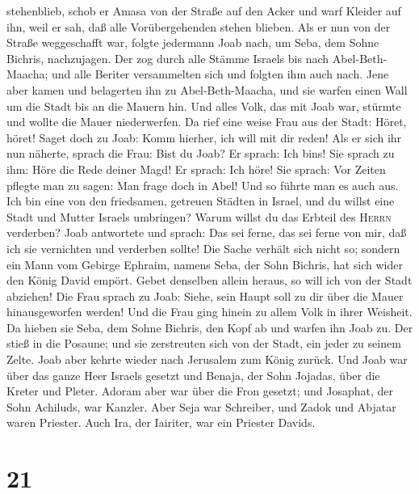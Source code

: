 stehenblieb, schob er Amasa von der Straße auf den Acker und warf
Kleider auf ihn, weil er sah, daß alle Vorübergehenden stehen blieben.
 Als er nun von der Straße weggeschafft war, folgte
jedermann Joab nach, um Seba, dem Sohne Bichris, nachzujagen.
 Der zog durch alle Stämme Israels bis nach
Abel-Beth-Maacha; und alle Beriter versammelten sich und folgten ihm
auch nach.  Jene aber kamen und belagerten ihn zu
Abel-Beth-Maacha, und sie warfen einen Wall um die Stadt bis an die
Mauern hin. Und alles Volk, das mit Joab war, stürmte und wollte die
Mauer niederwerfen.  Da rief eine weise Frau aus der
Stadt: Höret, höret! Saget doch zu Joab: Komm hierher, ich will mit dir
reden!  Als er sich ihr nun näherte, sprach die Frau:
Bist du Joab? Er sprach: Ich bin\textquotesingle s! Sie sprach zu ihm:
Höre die Rede deiner Magd! Er sprach: Ich höre!  Sie
sprach: Vor Zeiten pflegte man zu sagen: Man frage doch in Abel! Und so
führte man es auch aus.  Ich bin eine von den friedsamen,
getreuen Städten in Israel, und du willst eine Stadt und Mutter Israels
umbringen? Warum willst du das Erbteil des \textsc{Herrn} verderben?
 Joab antwortete und sprach: Das sei ferne, das sei ferne
von mir, daß ich sie vernichten und verderben sollte! 
Die Sache verhält sich nicht so; sondern ein Mann vom Gebirge Ephraim,
namens Seba, der Sohn Bichris, hat sich wider den König David empört.
Gebet denselben allein heraus, so will ich von der Stadt abziehen! Die
Frau sprach zu Joab: Siehe, sein Haupt soll zu dir über die Mauer
hinausgeworfen werden!  Und die Frau ging hinein zu allem
Volk in ihrer Weisheit. Da hieben sie Seba, dem Sohne Bichris, den Kopf
ab und warfen ihn Joab zu. Der stieß in die Posaune; und sie zerstreuten
sich von der Stadt, ein jeder zu seinem Zelte. Joab aber kehrte wieder
nach Jerusalem zum König zurück.  Und Joab war über das
ganze Heer Israels gesetzt und Benaja, der Sohn Jojadas, über die Kreter
und Pleter.  Adoram aber war über die Fron gesetzt; und
Josaphat, der Sohn Achiluds, war Kanzler.  Aber Seja war
Schreiber, und Zadok und Abjatar waren Priester.  Auch
Ira, der Iairiter, war ein Priester Davids.

\hypertarget{section-20}{%
\section{21}\label{section-20}}

